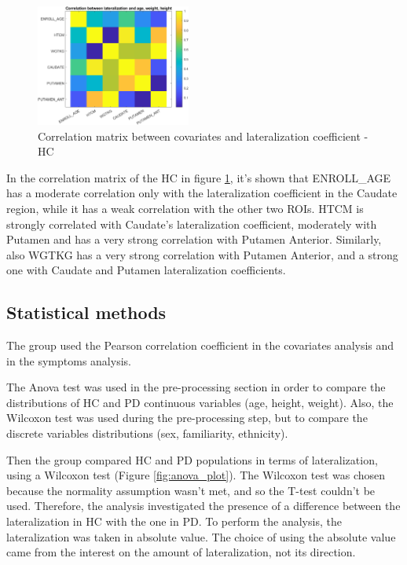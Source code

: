\documentclass[]{article}
\begin{document}
\begin{figure}[h]
	\centering
	\includegraphics[width=2in]{../covariates_mat_hc}
	\caption{Correlation matrix between covariates and lateralization coefficient - HC}
	\label{fig:cov_mat_hc}
\end{figure} 
 
\begin{multicols}{2}

In the correlation matrix of the HC in figure \ref{fig:cov_mat_hc}, it's shown that ENROLL\_AGE has a moderate correlation only with the lateralization coefficient in the Caudate region, while it has a weak correlation with the other two ROIs. HTCM is strongly correlated with Caudate's lateralization coefficient, moderately with Putamen and has a very strong correlation with Putamen Anterior. Similarly, also WGTKG has a very strong correlation with Putamen Anterior, and a strong one with Caudate and Putamen lateralization coefficients.

\subsection{Statistical methods}

The group used the Pearson correlation coefficient in the covariates analysis and in the symptoms analysis.

The Anova test was used in the pre-processing section in order to compare the distributions of HC and PD continuous variables (age, height, weight).
Also, the Wilcoxon test was used during the pre-processing step, but to compare the discrete variables distributions (sex, familiarity, ethnicity).

Then the group compared HC and PD populations in terms of lateralization, using a Wilcoxon test (Figure \ref{fig:anova_plot}). The Wilcoxon test was chosen because the normality assumption wasn't met, and so the T-test couldn't be used.
Therefore, the analysis investigated the presence of a difference between the lateralization in HC with the one in PD. To perform the analysis, the lateralization was taken in absolute value. The choice of using the absolute value came from the interest on the amount of lateralization, not its direction.


\end{multicols}
\end{document}
